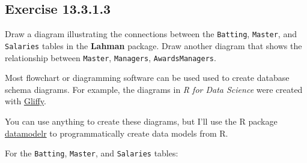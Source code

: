 \documentclass[]{book}
\newenvironment{Shaded}{\begin{snugshade}}{\end{snugshade}}
\newcommand{\CommentTok}[1]{\textcolor[rgb]{0.56,0.35,0.01}{\textit{#1}}}
\newcommand{\KeywordTok}[1]{\textcolor[rgb]{0.13,0.29,0.53}{\textbf{#1}}}
\newcommand{\NormalTok}[1]{#1}
\newcommand{\OperatorTok}[1]{\textcolor[rgb]{0.81,0.36,0.00}{\textbf{#1}}}
\newcommand{\StringTok}[1]{\textcolor[rgb]{0.31,0.60,0.02}{#1}}
\theoremstyle{plain}
\theoremstyle{remark}
\begin{document}
\begin{enumerate}
\begin{Shaded}
\end{Shaded}
\end{enumerate}

\hypertarget{exercise-13.3.1.3}{%
\subsection*{\texorpdfstring{Exercise
{13.3.1.3}}{Exercise 13.3.1.3}}\label{exercise-13.3.1.3}}

Draw a diagram illustrating the connections between the
\texttt{Batting}, \texttt{Master}, and \texttt{Salaries} tables in the
\textbf{Lahman} package. Draw another diagram that shows the
relationship between \texttt{Master}, \texttt{Managers},
\texttt{AwardsManagers}.

Most flowchart or diagramming software can be used used to create
database schema diagrams. For example, the diagrams in \emph{R for Data
Science} were created with \href{https://www.gliffy.com/}{Gliffy}.

You can use anything to create these diagrams, but I'll use the R
package \href{https://github.com/bergant/datamodelr}{datamodelr} to
programmatically create data models from R.

For the \texttt{Batting}, \texttt{Master}, and \texttt{Salaries} tables:
\end{document}
